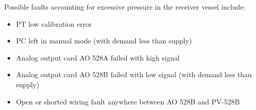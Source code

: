 Possible faults accounting for excessive pressure in the receiver vessel include:

\begin{itemize}
\item{} PT low calibration error
\item{} PC left in manual mode (with demand less than supply)
\item{} Analog output card AO 528A failed with high signal
\item{} Analog output card AO 528B failed with low signal (with demand less than supply)
\item{} Open or shorted wiring fault anywhere between AO 528B and PV-528B
\end{itemize}











